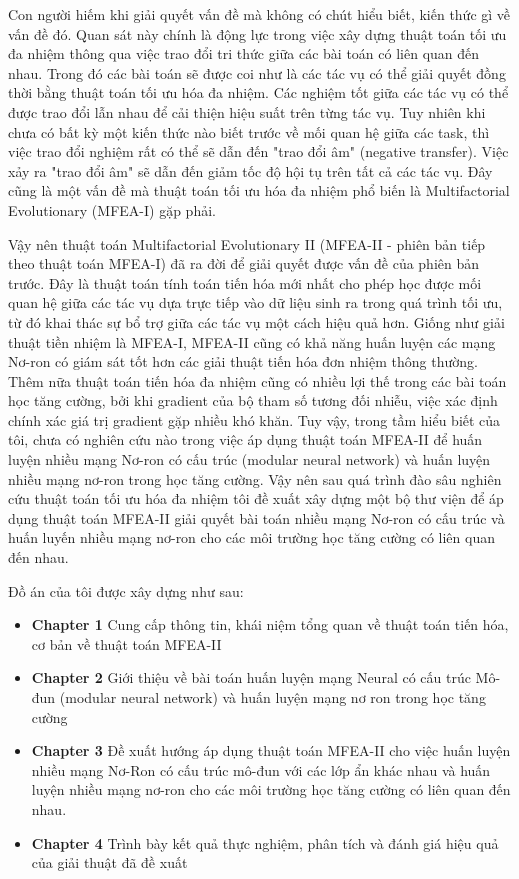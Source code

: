 Con người hiếm khi giải quyết vấn đề mà không có chút hiểu biết, kiến thức gì về vấn đề đó. Quan sát này chính là động lực trong việc xây dựng thuật toán tối ưu đa nhiệm thông qua việc trao đổi tri thức giữa các bài toán có liên quan đến nhau. Trong đó các bài toán sẽ được coi như là các tác vụ có thể giải quyết đồng thời bằng thuật toán tối ưu hóa đa nhiệm. Các nghiệm tốt giữa các tác vụ có thể được trao đổi lẫn nhau để cải thiện hiệu suất trên từng tác vụ. Tuy nhiên khi chưa có bất kỳ một kiến thức nào biết trước về mối quan hệ giữa các task, thì việc trao đổi nghiệm rất có thể sẽ dẫn đến "trao đổi âm" (negative transfer). Việc xảy ra "trao đổi âm" sẽ dẫn đến giảm tốc độ hội tụ trên tất cả các tác vụ. Đây cũng là một vấn đề mà thuật toán tối ưu hóa đa nhiệm phổ biến là Multifactorial Evolutionary (MFEA-I) gặp phải. 

Vậy nên thuật toán Multifactorial Evolutionary II (MFEA-II - phiên bản tiếp theo thuật toán MFEA-I) đã ra đời để giải quyết được vấn đề của phiên bản trước. Đây là thuật toán tính toán tiến hóa mới nhất cho phép học được mối quan hệ giữa các tác vụ dựa trực tiếp vào dữ liệu sinh ra trong quá trình tối ưu, từ đó khai thác sự bổ trợ giữa các tác vụ một cách hiệu quả hơn. Giống như giải thuật tiền nhiệm là MFEA-I, MFEA-II cũng có khả năng huấn luyện các mạng Nơ-ron có giám sát tốt hơn các giải thuật tiến hóa đơn nhiệm thông thường. Thêm nữa thuật toán tiến hóa đa nhiệm cũng có nhiều lợi thế trong các bài toán học tăng cường, bởi khi gradient của bộ tham số tương đối nhiễu, việc xác định chính xác giá trị gradient gặp nhiều khó khăn.
Tuy vậy, trong tầm hiểu biết của tôi, chưa có nghiên cứu nào trong việc áp dụng thuật toán MFEA-II để huấn luyện nhiều mạng Nơ-ron có cấu trúc (modular neural network) và huấn luyện nhiều mạng nơ-ron trong học tăng cường.  
Vậy nên sau quá trình đào sâu nghiên cứu thuật toán tối ưu hóa đa nhiệm tôi đề xuất xây dựng một bộ thư viện để áp dụng thuật toán MFEA-II giải quyết bài toán nhiều mạng Nơ-ron có cấu trúc và huấn luyến nhiều mạng nơ-ron cho các môi trường học tăng cường có liên quan đến nhau.

Đồ án của tôi được xây dựng như sau:
\begin{itemize}
  \item \textbf{Chapter 1} Cung cấp thông tin, khái niệm tổng quan về thuật toán tiến hóa, cơ bản về thuật toán MFEA-II
  \item \textbf{Chapter 2} Giới thiệu về bài toán huấn luyện mạng Neural có cấu trúc Mô-đun (modular neural network) và huấn luyện mạng nơ ron trong học tăng cường
  \item \textbf{Chapter 3} Đề xuất hướng áp dụng thuật toán MFEA-II cho việc huấn luyện nhiều mạng Nơ-Ron có cấu trúc mô-đun với các lớp ẩn khác nhau và huấn luyện nhiều mạng nơ-ron cho các môi trường học tăng cường có liên quan đến nhau.
  \item \textbf{Chapter 4} Trình bày kết quả thực nghiệm, phân tích và đánh giá hiệu quả của giải thuật đã đề xuất
\end{itemize}

\pagebreak
